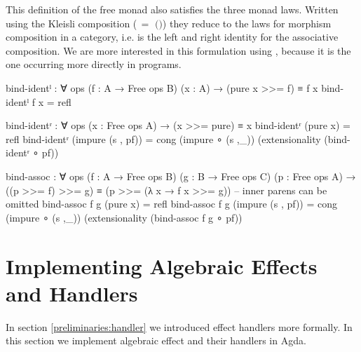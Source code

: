 This definition of the free monad also satisfies the three monad laws.
Written using the Kleisli composition
(\AgdaSpace{}\AgdaFunction{>=>}\AgdaSpace{}$\,=$
\AgdaSpace{}\AgdaSpace{}$($\AgdaFunction{\_}\AgdaFunction{>>=}\AgdaSpace{}$)$)
they reduce to the laws for morphism composition in a category, i.e.
 is the left and right identity for the
associative composition.
We are more interested in this formulation using \AgdaFunction{>>=}, because it
is the one occurring more directly in programs.

\begin{code}[number=bind-ident-left]
bind-identˡ : ∀ {ops} (f : A → Free ops B) (x : A) → (pure x >>= f) ≡ f x
bind-identˡ f x = refl
\end{code}
\begin{code}[number=bind-ident-right]
bind-identʳ : ∀ {ops} (x : Free ops A) → (x >>= pure) ≡ x
bind-identʳ (pure x)           = refl
bind-identʳ (impure (s , pf))  = cong (impure ∘ (s ,_)) (extensionality (bind-identʳ ∘ pf))
\end{code}
\begin{code}[number=bind-assoc]
bind-assoc : ∀ {ops} (f : A → Free ops B) (g : B → Free ops C) (p : Free ops A) →
  ((p >>= f) >>= g) ≡ (p >>= (λ x → f x >>= g)) -- inner parens can be omitted
bind-assoc f g (pure x)           = refl
bind-assoc f g (impure (s , pf))  = cong (impure ∘ (s ,_)) (extensionality (bind-assoc f g ∘ pf))
\end{code}


\section{Implementing Algebraic Effects and Handlers}
\label{first-order:effects-and-handlers}

In section \ref{preliminaries:handler} we introduced effect handlers more
formally.
In this section we implement algebraic effect and their handlers in Agda.

